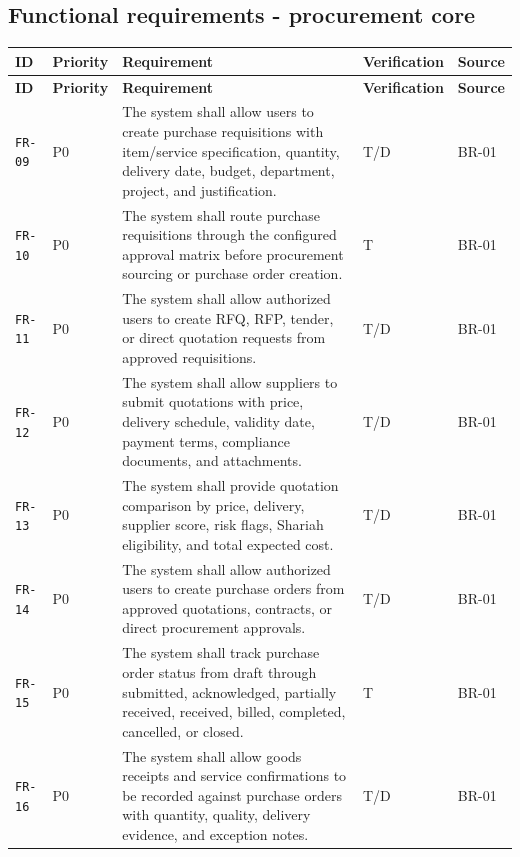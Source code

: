 \documentclass[11pt,a4paper]{article}
\begin{document}
\subsection{Functional requirements - procurement core}\label{sec:fr-procurement}
\begin{footnotesize}
\begin{longtable}{@{}p{}p{}p{}p{}p{}@{}}
\rowcolor{gray!18}\textbf{ID} & \textbf{Priority} & \textbf{Requirement} & \textbf{Verification} & \textbf{Source} \\ \hline
\endfirsthead
\rowcolor{gray!18}\textbf{ID} & \textbf{Priority} & \textbf{Requirement} & \textbf{Verification} & \textbf{Source} \\ \hline
\endhead
\texttt{FR-09} & P0 & The system shall allow users to create purchase requisitions with item/service specification, quantity, delivery date, budget, department, project, and justification. & T/D & BR-01 \\ \hline
\texttt{FR-10} & P0 & The system shall route purchase requisitions through the configured approval matrix before procurement sourcing or purchase order creation. & T & BR-01 \\ \hline
\texttt{FR-11} & P0 & The system shall allow authorized users to create RFQ, RFP, tender, or direct quotation requests from approved requisitions. & T/D & BR-01 \\ \hline
\texttt{FR-12} & P0 & The system shall allow suppliers to submit quotations with price, delivery schedule, validity date, payment terms, compliance documents, and attachments. & T/D & BR-01 \\ \hline
\texttt{FR-13} & P0 & The system shall provide quotation comparison by price, delivery, supplier score, risk flags, Shariah eligibility, and total expected cost. & T/D & BR-01 \\ \hline
\texttt{FR-14} & P0 & The system shall allow authorized users to create purchase orders from approved quotations, contracts, or direct procurement approvals. & T/D & BR-01 \\ \hline
\texttt{FR-15} & P0 & The system shall track purchase order status from draft through submitted, acknowledged, partially received, received, billed, completed, cancelled, or closed. & T & BR-01 \\ \hline
\texttt{FR-16} & P0 & The system shall allow goods receipts and service confirmations to be recorded against purchase orders with quantity, quality, delivery evidence, and exception notes. & T/D & BR-01 \\ \hline

\end{longtable}
\end{footnotesize}
\end{document}
